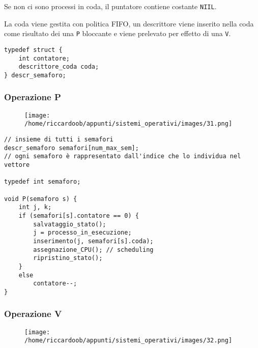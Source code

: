 Se non ci sono processi in coda, il puntatore contiene costante \texttt{NIIL}.

La coda viene gestita con politica FIFO, un descrittore viene inserito nella coda come risultato dei una \texttt{P} bloccante e viene prelevato per effetto di una \texttt{V}.

\begin{verbatim}
typedef struct {
    int contatore;
    descrittore_coda coda;
} descr_semaforo;
\end{verbatim}

\subsubsection{Operazione P}
\begin{figure}[H]
    \centering
    \texttt{[image: /home/riccardoob/appunti/sistemi\_operativi/images/31.png]}
\end{figure}

\begin{verbatim}
// insieme di tutti i semafori
descr_semaforo semafori[num_max_sem];
// ogni semaforo è rappresentato dall'indice che lo individua nel vettore

typedef int semaforo;

void P(semaforo s) {
    int j, k;
    if (semafori[s].contatore == 0) {
        salvataggio_stato();
        j = processo_in_esecuzione;
        inserimento(j, semafori[s].coda);
        assegnazione_CPU(); // scheduling
        ripristino_stato();
    }
    else 
        contatore--;
}
\end{verbatim}

\subsubsection{Operazione V}
\begin{figure}[H]
    \centering
    \texttt{[image: /home/riccardoob/appunti/sistemi\_operativi/images/32.png]}
\end{figure}


